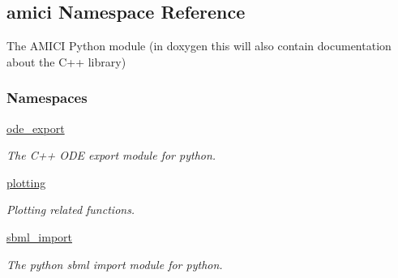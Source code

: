 \hypertarget{namespaceamici}{}\subsection{amici Namespace Reference}
\label{namespaceamici}


The A\+M\+I\+CI Python module (in doxygen this will also contain documentation about the C++ library)  


\subsubsection*{Namespaces}
\begin{DoxyCompactItemize}
\item 
 \mbox{\hyperlink{namespaceamici_1_1ode__export}{ode\+\_\+export}}
\begin{DoxyCompactList}\small\item\em The C++ O\+DE export module for python. \end{DoxyCompactList}\item 
 \mbox{\hyperlink{namespaceamici_1_1plotting}{plotting}}
\begin{DoxyCompactList}\small\item\em Plotting related functions. \end{DoxyCompactList}\item 
 \mbox{\hyperlink{namespaceamici_1_1sbml__import}{sbml\+\_\+import}}
\begin{DoxyCompactList}\small\item\em The python sbml import module for python. \end{DoxyCompactList}\end{DoxyCompactItemize}
